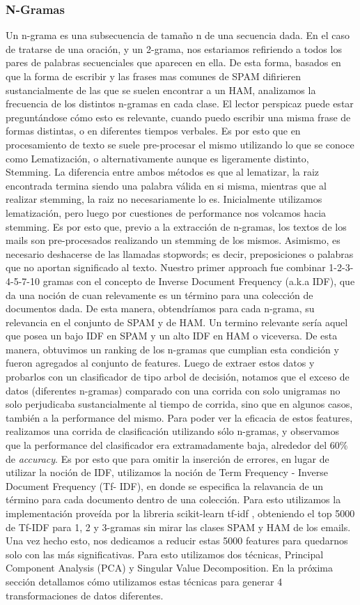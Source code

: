 \subsubsection*{N-Gramas}
Un n-grama es una subsecuencia de tamaño n de una secuencia dada. En el caso de tratarse de una oración, y un 2-grama, nos estariamos refiriendo a todos los pares de palabras secuenciales que aparecen en ella.
De esta forma, basados en que la forma de escribir y las frases mas comunes de SPAM difirieren sustancialmente de las que se suelen encontrar a un HAM, analizamos la frecuencia de los distintos n-gramas en cada clase.
El lector perspicaz puede estar preguntándose cómo esto es relevante, cuando puedo escribir una misma frase de formas distintas, o en diferentes tiempos verbales. Es por esto que en procesamiento de texto se suele pre-procesar el mismo utilizando lo que se conoce como Lematización, o alternativamente aunque es ligeramente distinto, Stemming. La diferencia entre ambos métodos es que al lematizar, la raiz encontrada termina siendo una palabra válida en si misma, mientras que al realizar stemming, la raiz no necesariamente lo es. Inicialmente utilizamos lematización, pero luego por cuestiones de performance nos volcamos hacia stemming. Es por esto que, previo a la extracción de n-gramas, los textos de los mails son pre-procesados realizando un stemming de los mismos. Asimismo, es necesario deshacerse de las llamadas stopwords; es decir, preposiciones o palabras que no aportan significado al texto.
Nuestro primer approach fue combinar 1-2-3-4-5-7-10 gramas con el concepto de Inverse Document Frequency (a.k.a IDF), que da una noción de cuan relevamente es un término para una colección de documentos dada. De esta manera, obtendríamos para cada n-grama, su relevancia en el conjunto de SPAM y de HAM. Un termino relevante sería aquel que posea un bajo IDF en SPAM y un alto IDF en HAM o viceversa.
De esta manera, obtuvimos un ranking de los n-gramas que cumplian esta condición y fueron agregados al conjunto de features.
Luego de extraer estos datos y probarlos con un clasificador de tipo arbol de decisión, notamos que el exceso de datos (diferentes n-gramas) comparado con una corrida con solo unigramas no solo perjudicaba sustancialmente al tiempo de corrida, sino que en algunos casos, también a la performance del mismo.
Para poder ver la eficacia de estos features, realizamos una corrida de clasificación utilizando sólo n-gramas, y observamos que la performance del clasificador era extramadamente baja, alrededor del 60\% de \textit{accuracy}.
Es por esto que para omitir la inserción de errores, en lugar de utilizar la noción de IDF, utilizamos la noción de Term Frequency - Inverse Document Frequency (Tf- IDF), en donde se especifica la relavancia de un término para cada documento dentro de una colección. Para esto utilizamos la implementación proveída por la libreria scikit-learn tf-idf \cite{tfidf}, obteniendo el top 5000 de Tf-IDF para 1, 2 y 3-gramas sin mirar las clases SPAM y HAM de los emails.
Una vez hecho esto, nos dedicamos a reducir estas 5000 features para quedarnos solo con las más significativas. Para esto utilizamos dos técnicas, Principal Component Analysis (PCA) y Singular Value Decomposition. En la próxima sección detallamos cómo utilizamos estas técnicas para generar 4 transformaciones de datos diferentes.